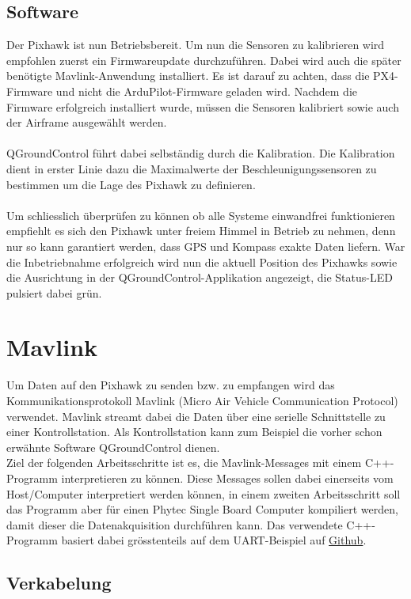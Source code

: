 \documentclass[12pt]{article} %
\begin{document}
	\subsection{Software}
	Der Pixhawk ist nun Betriebsbereit. Um nun die Sensoren zu kalibrieren wird empfohlen zuerst ein Firmwareupdate durchzuführen. Dabei wird auch die später benötigte Mavlink-Anwendung installiert. Es ist darauf zu achten, dass die PX4-Firmware und nicht die ArduPilot-Firmware geladen wird. Nachdem die Firmware erfolgreich installiert wurde, müssen die Sensoren kalibriert sowie auch der Airframe ausgewählt werden. 
	\\ \\
	QGroundControl führt dabei selbständig durch die Kalibration. Die Kalibration dient in erster Linie dazu die Maximalwerte der Beschleunigungssensoren zu bestimmen um die Lage des Pixhawk zu definieren.
	\\ \\
	Um schliesslich überprüfen zu können ob alle Systeme einwandfrei funktionieren empfiehlt es sich den Pixhawk unter freiem Himmel in Betrieb zu nehmen, denn nur so kann garantiert werden, dass GPS und Kompass exakte Daten liefern. War die Inbetriebnahme erfolgreich wird nun die aktuell Position des Pixhawks sowie die Ausrichtung in der QGroundControl-Applikation angezeigt, die Status-LED pulsiert dabei grün.
	
	
	\section{Mavlink}
	Um Daten auf den Pixhawk zu senden bzw. zu empfangen wird das Kommunikationsprotokoll Mavlink (Micro Air Vehicle Communication Protocol) verwendet. Mavlink streamt dabei die Daten über eine serielle Schnittstelle zu einer Kontrollstation. Als Kontrollstation kann zum Beispiel die vorher schon erwähnte Software QGroundControl dienen.
	\\Ziel der folgenden Arbeitsschritte ist es, die Mavlink-Messages mit einem C++-Programm interpretieren zu können. Diese Messages sollen dabei einerseits vom Host/Computer interpretiert werden können, in einem zweiten Arbeitsschritt soll das Programm aber für einen Phytec Single Board Computer kompiliert werden, damit dieser die Datenakquisition durchführen kann. Das verwendete C++-Programm basiert dabei grösstenteils auf dem UART-Beispiel auf \href{https://github.com/mavlink/c_uart_interface_example}{Github}.
	
	\subsection{Verkabelung}
\end{document}
